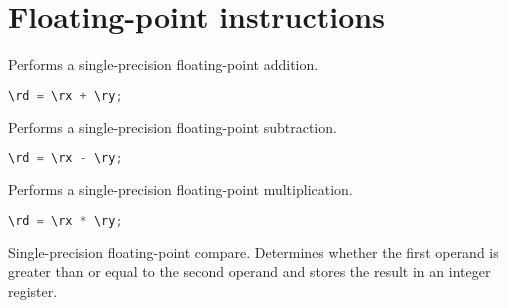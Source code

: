
\section{Floating-point instructions}

Performs a single-precision floating-point addition.

\begin{lstlisting}[numbers=none, basicstyle=\ttfamily\footnotesize, language=C++]
\rd = \rx + \ry;
\end{lstlisting}

Performs a single-precision floating-point subtraction.

\begin{lstlisting}[numbers=none, basicstyle=\ttfamily\footnotesize, language=C++]
\rd = \rx - \ry;
\end{lstlisting}

Performs a single-precision floating-point multiplication.

\begin{lstlisting}[numbers=none, basicstyle=\ttfamily\footnotesize, language=C++]
\rd = \rx * \ry;
\end{lstlisting}

Single-precision floating-point compare. Determines whether the first operand is greater than or equal to the second operand and stores
the result in an integer register.

